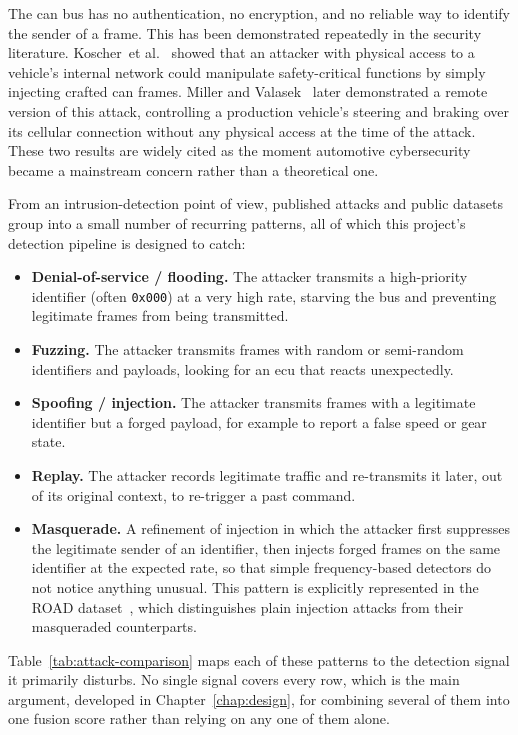 The \gls{can} bus has no authentication, no encryption, and no reliable way to identify the sender of a frame. This has been demonstrated repeatedly in the security literature. Koscher~et al.~\cite{koscher2010experimental} showed that an attacker with physical access to a vehicle's internal network could manipulate safety-critical functions by simply injecting crafted \gls{can} frames. Miller and Valasek~\cite{miller2015remote} later demonstrated a remote version of this attack, controlling a production vehicle's steering and braking over its cellular connection without any physical access at the time of the attack. These two results are widely cited as the moment automotive cybersecurity became a mainstream concern rather than a theoretical one.

From an intrusion-detection point of view, published attacks and public datasets group into a small number of recurring patterns, all of which this project's detection pipeline is designed to catch:

\begin{itemize}
    \item \textbf{Denial-of-service / flooding.} The attacker transmits a high-priority identifier (often \texttt{0x000}) at a very high rate, starving the bus and preventing legitimate frames from being transmitted.
    \item \textbf{Fuzzing.} The attacker transmits frames with random or semi-random identifiers and payloads, looking for an \gls{ecu} that reacts unexpectedly.
    \item \textbf{Spoofing / injection.} The attacker transmits frames with a legitimate identifier but a forged payload, for example to report a false speed or gear state.
    \item \textbf{Replay.} The attacker records legitimate traffic and re-transmits it later, out of its original context, to re-trigger a past command.
    \item \textbf{Masquerade.} A refinement of injection in which the attacker first suppresses the legitimate sender of an identifier, then injects forged frames on the same identifier at the expected rate, so that simple frequency-based detectors do not notice anything unusual. This pattern is explicitly represented in the ROAD dataset~\cite{verma2020road}, which distinguishes plain injection attacks from their masqueraded counterparts.
\end{itemize}

Table~\ref{tab:attack-comparison} maps each of these patterns to the detection signal it primarily disturbs. No single signal covers every row, which is the main argument, developed in Chapter~\ref{chap:design}, for combining several of them into one fusion score rather than relying on any one of them alone.

